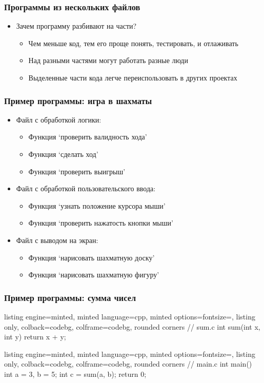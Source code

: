 \documentclass[10pt]{beamer}
\begin{document}
\begin{frame}[fragile]
\frametitle{Программы из нескольких файлов}
\begin{itemize}
\item Зачем программу разбивают на части?
\pause
\begin{itemize}
\item Чем меньше код, тем его проще понять, тестировать, и отлаживать
\pause
\item Над разными частями могут работать разные люди
\pause
\item Выделенные части кода легче переиспользовать в других проектах
\end{itemize}
\end{itemize}
\end{frame}

\begin{frame}[fragile]
\frametitle{Пример программы: игра в шахматы}
\begin{itemize}
\item Файл с обработкой логики:
\begin{itemize}
\item Функция `проверить валидность хода'
\item Функция `сделать ход'
\item Функция `проверить выигрыш'
\end{itemize}
\pause
\item Файл с обработкой пользовательского ввода:
\begin{itemize}
\item Функция `узнать положение курсора мыши'
\item Функция `проверить нажатость кнопки мыши'
\end{itemize}
\pause
\item Файл с выводом на экран:
\begin{itemize}
\item Функция `нарисовать шахматную доску'
\item Функция `нарисовать шахматную фигуру'
\end{itemize}
\end{itemize}
\end{frame}

\begin{frame}[fragile]
\frametitle{Пример программы: сумма чисел}
\begin{tcblisting}{listing engine=minted, minted language=cpp, minted options={fontsize=\scriptsize}, listing only, colback=codebg, colframe=codebg, rounded corners}
// sum.c
int sum(int x, int y) {
  return x + y;
}
\end{tcblisting}
\begin{tcblisting}{listing engine=minted, minted language=cpp, minted options={fontsize=\scriptsize}, listing only, colback=codebg, colframe=codebg, rounded corners}
// main.c
int main() {
  int a = 3, b = 5;
  int c = sum(a, b);
  return 0;
}
\end{tcblisting}
\end{frame}
\end{document}
